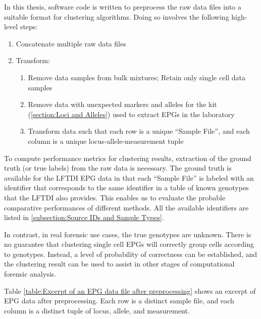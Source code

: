 In this thesis, software code is written to preprocess the raw data files into a suitable format for clustering algorithms. Doing so involves the following high-level steps:

\begin{enumerate}
  \item Concatenate multiple raw data files
  \item Transform:
  \begin{enumerate}
    \item Remove data samples from bulk mixtures; Retain only single cell data samples
    \item Remove data with unexpected markers and alleles for the kit (\ref{section:Loci and Alleles}) used to extract EPGs in the laboratory
    \item Transform data such that each row is a unique ``Sample File'', and each column is a unique locus-allele-measurement tuple
  \end{enumerate}
\end{enumerate}

To compute performance metrics for clustering results, extraction of the ground truth (or true labels) from the raw data is necessary. The ground truth is available for the LFTDI EPG data in that each ``Sample File'' is labeled with an identifier that corresponds to the same identifier in a table of known genotypes that the LFTDI also provides. This enables us to evaluate the probable comparative performances of different methods. All the available identifiers are listed in \ref{subsection:Source IDs and Sample Types}. 

In contrast, in real forensic use cases, the true genotypes are unknown. There is no guarantee that clustering single cell EPGs will correctly group cells according to genotypes. Instead, a level of probability of correctness can be established, and the clustering result can be used to assist in other stages of computational forensic analysis.

Table \ref{table:Excerpt of an EPG data file after preprocessing} shows an excerpt of EPG data after preprocessing. Each row is a distinct sample file, and each column is a distinct tuple of locus, allele, and measurement.

